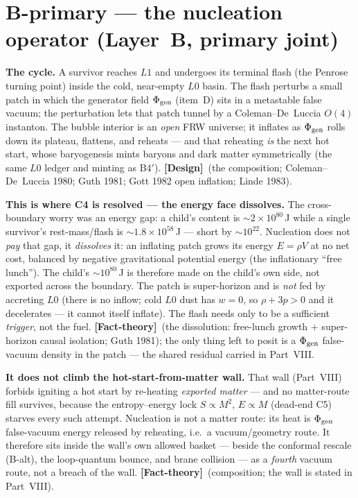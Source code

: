 \documentclass[11pt]{article}
\newcommand{\Design}{\textbf{\textcolor{purple!65!black}{[Design]}}}
\newcommand{\factth}{\textcolor{green!40!black}{\textbf{[Fact-theory]}}}
\begin{document}
\section*{B-primary --- the nucleation operator (Layer~B, primary joint)}
\noindent\textbf{The cycle.} A survivor reaches $L1$ and undergoes its terminal flash (the Penrose turning point) inside the cold, near-empty $L0$ basin. The flash perturbs a small patch in which the generator field $\Phi_{\rm gen}$ (item~D) sits in a metastable false vacuum; the perturbation lets that patch tunnel by a Coleman--De~Luccia $O(4)$ instanton. The bubble interior is an \emph{open} FRW universe; it inflates as $\Phi_{\rm gen}$ rolls down its plateau, flattens, and reheats --- and that reheating \emph{is} the next hot start, whose baryogenesis mints baryons and dark matter symmetrically (the same $L0$ ledger and minting as B4$'$). \Design\ (the composition; Coleman--De~Luccia 1980; Guth 1981; Gott 1982 open inflation; Linde 1983).

\medskip\noindent\textbf{This is where C4 is resolved --- the energy face dissolves.} The cross-boundary worry was an energy gap: a child's content is $\sim\!2\times10^{80}$\,J while a single survivor's rest-mass/flash is $\sim\!1.8\times10^{58}$\,J --- short by $\sim\!10^{22}$. Nucleation does not \emph{pay} that gap, it \emph{dissolves} it: an inflating patch grows its energy $E=\rho V$ at no net cost, balanced by negative gravitational potential energy (the inflationary ``free lunch''). The child's $\sim\!10^{80}$\,J is therefore made on the child's own side, not exported across the boundary. The patch is super-horizon and is \emph{not} fed by accreting $L0$ (there is no inflow; cold $L0$ dust has $w=0$, so $\rho+3p>0$ and it decelerates --- it cannot itself inflate). The flash needs only to be a sufficient \emph{trigger}, not the fuel. \factth\ (the dissolution: free-lunch growth $+$ super-horizon causal isolation; Guth 1981); the only thing left to posit is a $\Phi_{\rm gen}$ false-vacuum density in the patch --- the shared residual carried in Part~VIII.

\medskip\noindent\textbf{It does not climb the hot-start-from-matter wall.} That wall (Part~VIII) forbids igniting a hot start by re-heating \emph{exported matter} --- and no matter-route fill survives, because the entropy--energy lock $S\propto M^2$, $E\propto M$ (dead-end C5) starves every such attempt. Nucleation is not a matter route: its heat is $\Phi_{\rm gen}$ false-vacuum energy released by reheating, i.e.\ a vacuum/geometry route. It therefore sits inside the wall's own allowed basket --- beside the conformal rescale (B-alt), the loop-quantum bounce, and brane collision --- as a \emph{fourth} vacuum route, not a breach of the wall. \factth\ (composition; the wall is stated in Part~VIII).
\end{document}
